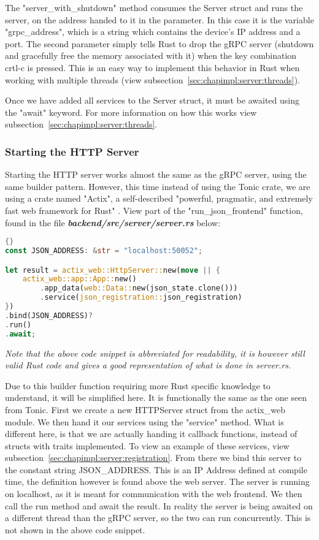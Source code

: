 The "server\_with\_shutdown" method consumes the Server struct and runs the server, on the address handed to it in the parameter. In this case it is the variable "grpc\_address", which is a string which contains the device's IP address and a port. The second parameter simply tells Rust to drop the gRPC server (shutdown and gracefully free the memory associated with it) when the key combination crtl-c is pressed. This is an easy way to implement this behavior in Rust when working with multiple threads (view subsection~\ref{sec:chapimpl:server:threads}).

Once we have added all services to the Server struct, it must be awaited using the "await" keyword. For more information on how this works view subsection~\ref{sec:chapimpl:server:threads}.  

\subsubsection{Starting the HTTP Server}
Starting the HTTP server works almost the same as the gRPC server, using the same builder pattern. However, this time instead of using the Tonic crate, we are using a crate named "Actix", a self-described "powerful, pragmatic, and extremely fast web framework for Rust" \cite{actixWebsite}. View part of the "run\_json\_frontend" function, found in the file \textbf{\textit{backend/src/server/server.rs}} below:
\begin{lstlisting}[language=Rust, style=boxed, showstringspaces=false]{}
const JSON_ADDRESS: &str = "localhost:50052";

let result = actix_web::HttpServer::new(move || {
    actix_web::app::App::new()
        .app_data(web::Data::new(json_state.clone()))
        .service(json_registration::json_registration)
})
.bind(JSON_ADDRESS)?
.run()
.await;
\end{lstlisting}
\textit{Note that the above code snippet is abbreviated for readability, it is however still valid Rust code and gives a good representation of what is done in server.rs.} 

Due to this builder function requiring more Rust specific knowledge to understand, it will be simplified here. It is functionally the same as the one seen from Tonic. First we create a new HTTPServer struct from the actix\_web module. We then hand it our services using the "service" method. What is different here, is that we are actually handing it callback functions, instead of structs with traits implemented. To view an example of these services, view subsection~\ref{sec:chapimpl:server:registration}. From there we bind this server to the constant string JSON\_ADDRESS. This is an IP Address defined at compile time, the definition however is found above the web server. The server is running on localhost, as it is meant for communication with the web frontend. We then call the run method and await the result. In reality the server is being awaited on a different thread than the gRPC server, so the two can run concurrently. This is not shown in the above code snippet. 

